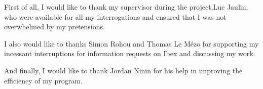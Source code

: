 
First of all, I would like to thank my supervisor during the project,Luc Jaulin, who were available for all my interrogations and ensured that I was not overwhelmed by my pretensions.

I also would like to thanks Simon Rohou and Thomas Le Mézo for supporting my incessant interruptions for information requests on Ibex and discussing my  work.

And finally, I would like to thank Jordan Ninin for his help in improving the efficiency of my program.